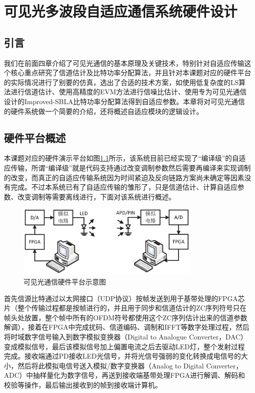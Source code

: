 \chapter{可见光多波段自适应通信系统硬件设计}
\section{引言}
我们在前面四章介绍了可见光通信的基本原理及关键技术，特别针对自适应传输这个核心重点研究了信道估计及比特功率分配算法，并且针对本课题对应的硬件平台的实际情况进行了别要的仿真，选出了合适的技术方案，如使用低复杂度的LS算法进行信道估计、使用高精度的EVM方法进行信噪比估计、使用专为可见光通信设计的Improved-SBLA比特功率分配算法得到自适应参数。本章将对可见光通信的硬件系统做一个简要的介绍，还将概述自适应模块的逻辑设计。
\section{硬件平台概述}
本课题对应的硬件演示平台如图\ref{fig:Hardware_Structure}所示，该系统目前已经实现了“编译级”的自适应传输，所谓“编译级”就是代码支持通过改变调制参数然后需要再编译来实现调制的改变，而真正的自适应传输系统因为时间紧迫及反向链路方案尚未确定等因素没有完成。不过本系统已有了自适应传输的雏形了，只是信道估计、计算自适应参数、改变调制等需要离线进行，下面对该系统进行概述。
\begin{figure}[htbp] 
\centering
\includegraphics[width=0.8\textwidth]{figures/chapter-5/Hardware_Structure.eps}
\caption{可见光通信硬件平台示意图}
\label{fig:Hardware_Structure}
\end{figure}

首先信源比特通过以太网接口（UDP协议）按帧发送到用于基带处理的FPGA芯片（整个传输过程都是按帧进行的，并且用于同步和信道估计的ZC序列符号只在帧头处放置，整个帧中所有的OFDM符号都使用这个ZC序列估计出来的信道参数解调），接着在FPGA中完成扰码、信道编码、调制和IFFT等数字处理过程，然后将时域数字信号输入到数字模拟变换器（Digital to Analogue Converter，DAC）变成模拟信号，最后该模拟信号加上偏置电流之后去驱动LED灯，整个发射过程完成。接收端通过PD接收LED光信号，并将光信号强弱的变化转换成电信号的大小，然后将此模拟电信号送入模拟/数字变换器（Analog to Digital Converter，ADC）中抽样量化为数字信号，再送到接收端基带处理FPGA进行解调、解码和校验等操作，最后输出接收到的帧到接收端计算机。
